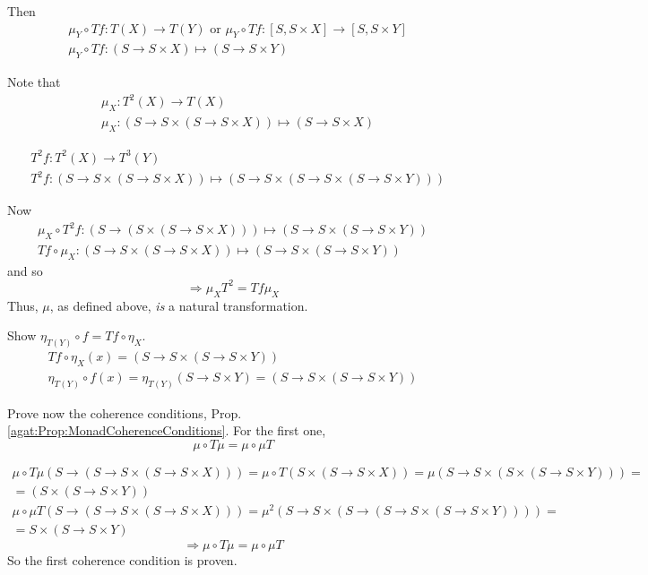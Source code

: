Then
\begin{equation}
\begin{aligned}
& \mu_Y \circ Tf : T(X) \to T(Y) \text{ or } \mu_Y \circ Tf : [S, S \times X] \to [S, S \times Y] \\ 
& \mu_Y \circ Tf: (S \to S \times X) \mapsto (S \to S \times Y)
\end{aligned}
\end{equation}

Note that 
\begin{equation}
	\begin{aligned}
	& \mu_X : T^2(X) \to T(X) \\ 
	& \mu_X : (S \to S \times (S \to S \times X)) \mapsto (S \to S \times X)
	\end{aligned}
\end{equation} 

\begin{equation}
\begin{aligned}
& T^2 f : T^2(X) \to T^3(Y) \\  
& T^2 f: (S \to S \times (S \to S\times X)) \mapsto (S \to S \times (S \to S \times (S \to S \times Y)))
\end{aligned}
\end{equation}

Now
\[
\begin{gathered} 
 \mu_X \circ T^2 f : (S \to (S \times (S \to S \times X))) \mapsto (S \to S \times (S \to S \times Y)) \\ 
 Tf \circ \mu_X : (S \to S \times (S \to S \times X)) \mapsto (S \to S \times (S \to S \times Y))
\end{gathered} 
\]
and so 
\[
\Longrightarrow \mu_X T^2 = Tf \mu_X 
\]
Thus, $\mu$, as defined above, \emph{is} a natural transformation.

Show $\eta_{T(Y)} \circ f = Tf\circ \eta_X$. 
\[
\begin{gathered} 
	Tf \circ \eta_X (x) = (S \to S \times (S \to S \times Y)) \\ 
 \eta_{T(Y)} \circ f(x) = \eta_{T(Y)} (S \to S \times Y) = (S \to S \times (S \to S \times Y))
\end{gathered} 
\]


Prove now the coherence conditions, Prop. \ref{agat:Prop:MonadCoherenceConditions}. For the first one,
\[
\mu \circ T \mu = \mu \circ \mu T
\]

\[
\begin{gathered} 
	\mu \circ T \mu (S \to (S \to S \times (S\to S \times X))) = \mu \circ T (S \times (S \to S \times X)) = \mu (S \to S \times (S \times (S \to S \times Y))) = \\
	= (S \times (S \to S \times Y)) \\ 
 \mu\circ \mu T (S \to (S \to S \times (S\to S \times X))) = \mu^2 (S \to S \times (S \to (S \to S \times (S \to S \times Y)))) = \\
 	= S \times (S \to S \times Y)
\end{gathered} 
\]
\[
\Longrightarrow \mu \circ T \mu = \mu \circ \mu T
\]
So the first coherence condition is proven.


